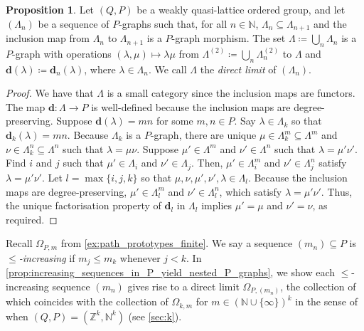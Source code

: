 \documentclass[11pt]{amsart}
\theoremstyle{definition}
\numberwithin{thm}{section}
\numberwithin{equation}{section}
\newtheorem{proposition}[thm]{Proposition}
\newcommand{\Define}[1]{\emph{#1}}
\newcommand{\Z}{\mathbb{Z}}
\newcommand{\N}{\mathbb{N}}
\newcommand{\degree}{\mathbf{d}}
\newcommand{\composablepairs}[1]{#1^{(2)}}
\begin{document}
\begin{proposition}
\label{prop:union_of_nested_graphs}
Let $(Q, P)$ be a weakly quasi-lattice ordered group, and let $(\Lambda_n)$ be a sequence of $P$-graphs such that, for all $n \in \N$, $\Lambda_n \subseteq \Lambda_{n+1}$ and the inclusion map from $\Lambda_n$ to $\Lambda_{n+1}$ is a $P$-graph morphism.
The set $\Lambda \coloneqq \bigcup_{n} \Lambda_n$ is a $P$-graph with operations $(\lambda, \mu) \mapsto \lambda\mu$ from $\composablepairs{\Lambda} \coloneqq \bigcup_{n} \composablepairs{\Lambda_n}$ to $\Lambda$ and $\degree(\lambda) \coloneqq \degree_n(\lambda)$, where $\lambda \in \Lambda_n$. 
We call $\Lambda$ the \Define{direct limit} of $(\Lambda_n)$.
\end{proposition}
\begin{proof}
We have that $\Lambda$ is a small category since the inclusion maps are functors.
The map $\degree \colon \Lambda \to P$ is well-defined because the inclusion maps are degree-preserving.
Suppose $\degree(\lambda) = mn$ for some $m, n \in P$.
Say $\lambda \in \Lambda_k$ so that $\degree_k(\lambda) = mn$.
Because $\Lambda_k$ is a $P$-graph, there are unique $\mu \in \Lambda_k^m \subseteq \Lambda^m$ and $\nu \in \Lambda_k^n \subseteq \Lambda^n$ such that $\lambda = \mu\nu$.
Suppose $\mu' \in \Lambda^m$ and $\nu' \in \Lambda^n$ such that $\lambda = \mu'\nu'$.
Find $i$ and $j$ such that $\mu' \in \Lambda_i$ and $\nu' \in \Lambda_j$.
Then, $\mu' \in \Lambda_i^m$ and $\nu' \in \Lambda_j^n$ satisfy $\lambda = \mu'\nu'$.
Let $l = \max\{i, j, k\}$ so that $\mu, \nu, \mu', \nu', \lambda \in \Lambda_l$.
Because the inclusion maps are degree-preserving, $\mu' \in \Lambda_l^m$ and $\nu' \in \Lambda_l^n$, which satisfy $\lambda = \mu'\nu'$. 
Thus, the unique factorisation property of $\degree_l$ in $\Lambda_l$ implies $\mu' = \mu$ and $\nu' = \nu$, as required.
\end{proof}

Recall $\Omega_{P, m}$ from \cref{ex:path_prototypes_finite}.
We say a sequence $(m_n) \subseteq P$ is \Define{$\leq$-increasing} if $m_j \leq m_k$ whenever $j < k$. 
In \cref{prop:increasing_sequences_in_P_yield_nested_P_graphs}, we show each $\leq$-increasing sequence $(m_n)$ gives rise to a direct limit $\Omega_{P, (m_n)}$, the collection of which coincides with the collection of $\Omega_{k, m}$ for $m \in (\N \cup \{\infty\})^k$ in the sense of \cite{Yee07} when $(Q, P) = (\Z^k, \N^k)$ (see \cref{sec:k}).
\end{document}
